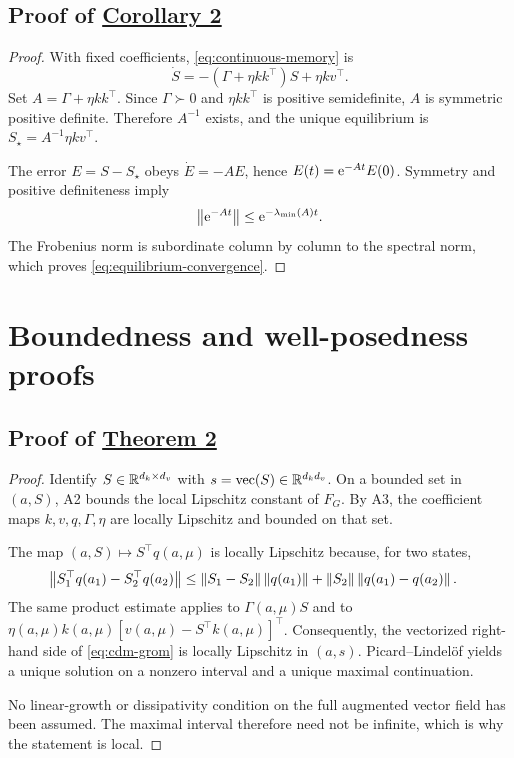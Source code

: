\subsection{Proof of \hyperref[cor:fixed-equilibrium]{Corollary 2}}
\label{app:equilibrium}

\begin{proof}
With fixed coefficients, \eqref{eq:continuous-memory} is
\begin{equation}
 \dot S=-(\Gamma+\eta kk^\top)S+\eta kv^\top.
 \label{eq:fixed-memory-linear}
\end{equation}
Set $A=\Gamma+\eta kk^\top$. Since $\Gamma\succ0$ and $\eta kk^\top$
is positive semidefinite, $A$ is symmetric positive definite. Therefore
$A^{-1}$ exists, and the unique equilibrium is
$S_\star=A^{-1}\eta kv^\top$.

The error $E=S-S_\star$ obeys $\dot E=-AE$, hence
$E(t)=\mathrm{e}^{-At}E(0)$. Symmetry and positive definiteness imply
\begin{equation}
 \left\lVert \mathrm{e}^{-At}\right\rVert\le\mathrm{e}^{-\lambda_{\min}(A)t}.
 \label{eq:spd-semigroup}
\end{equation}
The Frobenius norm is subordinate column by column to the spectral norm,
which proves \eqref{eq:equilibrium-convergence}.
\end{proof}

\section{Boundedness and well-posedness proofs}
\label{app:boundedness}

\subsection{Proof of \hyperref[thm:local-wellposedness]{Theorem 2}}
\label{app:wellposedness}

\begin{proof}
Identify $S\in\mathbb{R}^{d_k\times d_v}$ with
$s=\operatorname{vec}(S)\in\mathbb{R}^{d_kd_v}$. On a bounded set in $(a,S)$,
A2 bounds the local Lipschitz constant of $F_G$. By A3, the coefficient maps
$k,v,q,\Gamma,\eta$ are locally Lipschitz and bounded on that set.

The map $(a,S)\mapsto S^\top q(a,\mu)$ is locally Lipschitz because, for two
states,
\begin{align}
 \left\lVert S_1^\top q(a_1)-S_2^\top q(a_2)\right\rVert
 &\le
 \left\lVert S_1-S_2\right\rVert\left\lVert q(a_1)\right\rVert
 +\left\lVert S_2\right\rVert\left\lVert q(a_1)-q(a_2)\right\rVert.
 \label{eq:read-lipschitz}
\end{align}
The same product estimate applies to
$\Gamma(a,\mu)S$ and to
$\eta(a,\mu)k(a,\mu)[v(a,\mu)-S^\top k(a,\mu)]^\top$.
Consequently, the vectorized right-hand side of \eqref{eq:cdm-grom} is
locally Lipschitz in $(a,s)$. Picard--Lindel\"of yields a unique solution on a
nonzero interval and a unique maximal continuation.

No linear-growth or dissipativity condition on the full augmented vector
field has been assumed. The maximal interval therefore need not be infinite,
which is why the statement is local.
\end{proof}

